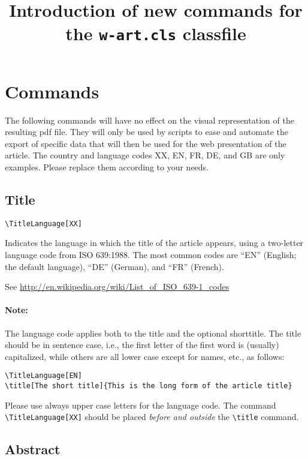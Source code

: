 \documentclass{article}
\begin{document}
\title{Introduction of new commands for the \texttt{w-art.cls}
  classfile}
\maketitle

\section{Commands}


The following commands will have no effect on the visual representation of the
resulting pdf file. They will only be used by scripts to ease and automate the
export of specific data that will then be used for the web presentation of the
article. The country and language codes XX, EN, FR, DE, and GB are only
examples. Please replace them according to your needs.

\subsection{Title}


\verb+\TitleLanguage[XX]+


Indicates the language in which the title of the article appears, using a
two-letter language code from ISO 639:1988. The most common codes are ``EN''
(English; the default language), ``DE'' (German), and ``FR'' (French). 

See \url{http://en.wikipedia.org/wiki/List_of_ISO_639-1_codes}

\paragraph{Note:} The language code applies both to the title and the optional
shorttitle.  The title should be in sentence case, i.e., the first letter of
the first word is (usually) capitalized, while others are all lower case
except for names, etc., as follows:

\begin{verbatim}
\TitleLanguage[EN]
\title[The short title]{This is the long form of the article title}
\end{verbatim}
Please  use always upper case letters for the language code. The command
\verb+\TitleLanguage[XX]+ should be placed \emph{before and outside} the \verb+\title+ command.


\subsection{Abstract}
\end{document}
